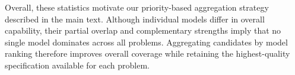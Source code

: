 Overall, these statistics motivate our priority-based aggregation strategy described in the main text. Although individual models differ in overall capability, their partial overlap and complementary strengths imply that no single model dominates across all problems. Aggregating candidates by model ranking therefore improves overall coverage while retaining the highest-quality specification available for each problem.
